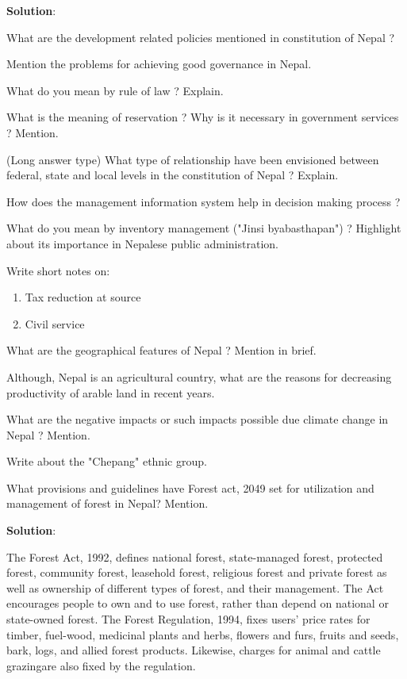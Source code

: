 \documentclass[
]{book}
\newcommand{\question}{\item}
\newenvironment{solution}{ {\bfseries Solution}:}{}
\begin{document}
\begin{questions}
\begin{solution}
\end{solution}

\question What are the development related policies mentioned in constitution of Nepal ?

\question Mention the problems for achieving good governance in Nepal.

\question What do you mean by rule of law ? Explain.

\question What is the meaning of reservation ? Why is it necessary in government services ? Mention.

\question (Long answer type) What type of relationship have been envisioned between federal, state and local levels in the constitution of Nepal ? Explain.

\question How does the management information system help in decision making process ?

\question What do you mean by inventory management ("Jinsi byabasthapan") ? Highlight about its importance in Nepalese public administration.

\question Write short notes on:
\begin{enumerate}[label*=\alph*., leftmargin=1cm]
\item Tax reduction at source
\item Civil service 
\end{enumerate}

\question What are the geographical features of Nepal ? Mention in brief.

\question Although, Nepal is an agricultural country, what are the reasons for decreasing productivity of arable land in recent years.

\question What are the negative impacts or such impacts possible due climate change in Nepal ? Mention.

\question Write about the "Chepang" ethnic group.

\question What provisions and guidelines have Forest act, 2049 set for utilization and management of forest in Nepal? Mention.

\begin{solution}

The Forest Act, 1992, defines national forest, state-managed forest, protected forest, community forest, leasehold forest, religious forest and private forest as well as ownership of different types of forest, and their management. The Act encourages people to own and to use forest, rather than depend on national or state-owned forest. The Forest Regulation, 1994, fixes users' price rates for timber, fuel-wood, medicinal plants and herbs, flowers and furs, fruits and seeds, bark, logs, and allied forest products. Likewise, charges for animal and cattle grazingare also fixed by the regulation.


\end{solution}
\end{questions}
\end{document}
